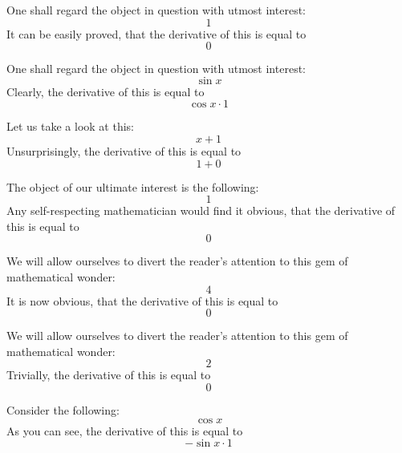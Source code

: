 \documentclass{article}
\begin{document}
One shall regard the object in question with utmost interest:
\begin{equation}
1 
\end{equation}
It can be easily proved, that the derivative of this is equal to
\begin{equation}
0 
\end{equation}

One shall regard the object in question with utmost interest:
\begin{equation}
\sin x 
\end{equation}
Clearly, the derivative of this is equal to
\begin{equation}
\cos x \cdot 1 
\end{equation}

Let us take a look at this:
\begin{equation}
x + 1 
\end{equation}
Unsurprisingly, the derivative of this is equal to
\begin{equation}
1 + 0 
\end{equation}

The object of our ultimate interest is the following:
\begin{equation}
1 
\end{equation}
Any self-respecting mathematician would find it obvious, that the derivative of this is equal to
\begin{equation}
0 
\end{equation}

We will allow ourselves to divert the reader's attention to this gem of mathematical wonder:
\begin{equation}
4 
\end{equation}
It is now obvious, that the derivative of this is equal to
\begin{equation}
0 
\end{equation}

We will allow ourselves to divert the reader's attention to this gem of mathematical wonder:
\begin{equation}
2 
\end{equation}
Trivially, the derivative of this is equal to
\begin{equation}
0 
\end{equation}

Consider the following:
\begin{equation}
\cos x 
\end{equation}
As you can see, the derivative of this is equal to
\begin{equation}
-\sin x \cdot 1 
\end{equation}
\end{document}
